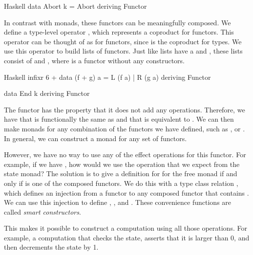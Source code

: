 \begin{lst}{Haskell}
data Abort k = Abort
  deriving Functor
\end{lst}
%
In contrast with monads, these functors can be meaningfully composed. We define a type-level operator \hs{+}, which represents a coproduct for functors. This operator can be thought of as  for functors, since  is the coproduct for types. We use this operator to build lists of functors. Just like lists have a  and , these lists consist of \hs{+} and , where  is a functor without any constructors.

\begin{lst}{Haskell}
infixr 6 +
data (f + g) a = L (f a) | R (g a)
  deriving Functor

data End k
  deriving Functor
\end{lst}
%
The  functor has the property that it does not add any operations. Therefore, we have that
 is functionally the same as  and that  is equivalent to . We can then make monads for any combination of the functors we have defined, such as ,  or . In general, we can construct a monad for any set of functors.

However, we have no way to use any of the effect operations for this functor. For example, if we have , how would we use the  operation that we expect from the state monad? The solution is to give a definition for  for the free monad if and only if  is one of the composed functors. We do this with a type class relation \hs{<}, which defines an injection from a functor  to any composed functor  that contains . We can use this injection to define , , and . These convenience functions are called \emph{smart constructors}.

%
This makes it possible to construct a computation using all those operations. For example, a computation that checks the state, asserts that it is larger than 0, and then decrements the state by 1.

